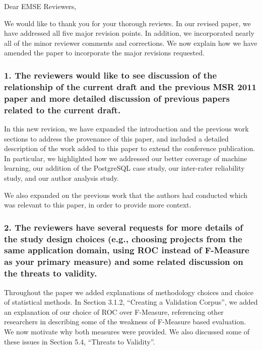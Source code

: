 \documentclass{article}
\begin{document}
Dear EMSE Reviewers,

\vspace{2mm}

We would like to thank you for your thorough reviews. In our revised paper,
we have addressed all five  major revision points. In addition, we incorporated nearly all of the
minor reviewer comments and corrections. 
We now explain how we have amended the paper to incorporate the major revisions requested.

\subsubsection*{1. The reviewers would like to see discussion of the relationship of
 the current draft and the previous MSR 2011 paper and more detailed
 discussion of previous papers related to the current draft.}

In this new revision, we have expanded the introduction and the previous work sections to address
the provenance of this paper, and included a detailed description of the work added to 
this paper to extend the conference publication. In particular, we highlighted how we 
addressed our better coverage of machine learning, our addition of the
PostgreSQL case study, our inter-rater reliability study, and our author
analysis study.

We also expanded on the previous work that the authors had conducted 
 which was relevant to this paper, in order to provide more
context.

\subsubsection*{2. The reviewers have several requests for more details of the study
   design choices (e.g., choosing projects from the same application
   domain, using ROC instead of F-Measure as your primary measure) and
   some related discussion on the threats to validity.}

Throughout the paper we added explanations of 
methodology choices and choice of statistical methods.
In Section 3.1.2, ``Creating a Validation Corpus'', we added an explanation of our choice of 
ROC over F-Measure, referencing other researchers in describing some of the weakness of F-Measure
based evaluation. We now motivate why both measures were provided.
We also discussed some of these issues in Section 5.4, ``Threats to
Validity''.
\end{document}
